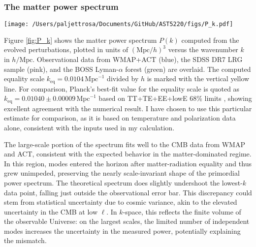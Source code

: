 \documentclass{aa}
\numberwithin{equation}{section}
\numberwithin{table}{section}
\numberwithin{figure}{section}
\begin{document}
\subsubsection{The matter power spectrum}

\begin{figure*}
\centering
\texttt{[image: /Users/paljettrosa/Documents/GitHub/AST5220/figs/P\_k.pdf]}
\caption{The matter power spectrum $P(k)$ in units of (Mpc/$h$)$^3$. Theoretical prediction (black) is compared to CMB data from WMAP+ACT (blue), SDSS DR7 Luminous Red Galaxies (pink), and Lyman-$\alpha$ forest observations from BOSS (green). The equality scale $k_\text{eq}$ is marked in yellow, and the inset highlights BAO oscillations in the SDSS range.}
\label{fig:P_k}
\end{figure*}

Figure \ref{fig:P_k} shows the matter power spectrum $P(k)$ computed from the evolved perturbations, plotted in units of $(\text{Mpc}/h)^3$ versus the wavenumber $k$ in $h/\text{Mpc}$. Observational data from WMAP+ACT (blue), the SDSS DR7 LRG sample (pink), and the BOSS Lyman-$\alpha$ forest (green) are overlaid. The computed equality scale $k_\text{eq} = 0.0104\,\text{Mpc}^{-1}$ divided by $h$ is marked with the vertical yellow line. For comparison, Planck's best-fit value for the equality scale is quoted as $k_\text{eq} = 0.01040\pm0.00009\,\text{Mpc}^{-1}$ based on TT+TE+EE+lowE 68\% limits \citep[see][]{Planck}, showing excellent agreement with the numerical result. I have chosen to use this particular estimate for comparison, as it is based on temperature and polarization data alone, consistent with the inputs used in my calculation.

The large-scale portion of the spectrum fits well to the CMB data from WMAP and ACT, consistent with the expected behavior in the matter-dominated regime. In this region, modes entered the horizon after matter-radiation equality and thus grew unimpeded, preserving the nearly scale-invariant shape of the primordial power spectrum. The theoretical spectrum does slightly undershoot the lowest-$k$ data point, falling just outside the observational error bar. This discrepancy could stem from statistical uncertainty due to cosmic variance, akin to the elevated uncertainty in the CMB at low $\ell$. In $k$-space, this reflects the finite volume of the observable Universe: on the largest scales, the limited number of independent modes increases the uncertainty in the measured power, potentially explaining the mismatch.
\end{document}
